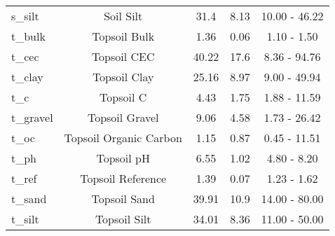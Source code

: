 \begin{table}[H]
\begin{tabular}{lcccc}
			s\_silt & Soil Silt & 31.4 & 8.13 & 10.00 - 46.22 \\
			t\_bulk & Topsoil Bulk & 1.36 & 0.06 & 1.10 - 1.50 \\
			t\_cec & Topsoil CEC & 40.22 & 17.6 & 8.36 - 94.76 \\
			t\_clay & Topsoil Clay & 25.16 & 8.97 & 9.00 - 49.94 \\
			t\_c & Topsoil C & 4.43 & 1.75 & 1.88 - 11.59 \\
			t\_gravel & Topsoil Gravel & 9.06 & 4.58 & 1.73 - 26.42 \\
			t\_oc & Topsoil Organic Carbon & 1.15 & 0.87 & 0.45 - 11.51 \\
			t\_ph & Topsoil pH & 6.55 & 1.02 & 4.80 - 8.20 \\
			t\_ref & Topsoil Reference & 1.39 & 0.07 & 1.23 - 1.62 \\
			t\_sand & Topsoil Sand & 39.91 & 10.9 & 14.00 - 80.00 \\
			t\_silt & Topsoil Silt & 34.01 & 8.36 & 11.00 - 50.00 \\
			\bottomrule
		\end{tabular}
\end{table}

